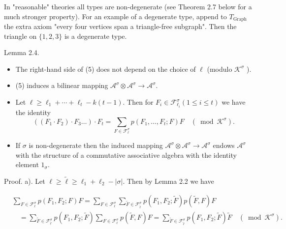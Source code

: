 \documentclass[10pt]{article}
\begin{document}
In "reasonable" theories all types are non-degenerate (see Theorem 2.7 below for a much stronger property). For an example of a degenerate type, append to $T_{\text {Graph }}$ the extra axiom "every four vertices span a triangle-free subgraph". Then the triangle on $\{1,2,3\}$ is a degenerate type.

Lemma 2.4.

\begin{itemize}
  \item[a)] The right-hand side of (5) does not depend on the choice of $\ell$ (modulo $\mathcal{K}^{\sigma}$ ).
  \item[b)] (5) induces a bilinear mapping $\mathcal{A}^{\sigma} \otimes \mathcal{A}^{\sigma} \longrightarrow \mathcal{A}^{\sigma}$.
\end{itemize}

\begin{itemize}
  \item[c)] Let $\ell \geq \ell_{1}+\cdots+\ell_{t}-k(t-1)$. Then for $F_{i} \in \mathcal{F}_{\ell_{i}}^{\sigma}(1 \leq i \leq t)$ we have the identity
$$
\left(\left(F_{1} \cdot F_{2}\right) \cdot F_{3} \ldots\right) \cdot F_{t}=\sum_{F \in \mathcal{F}_{\ell}^{\sigma}} p\left(F_{1}, \ldots, F_{t} ; F\right) F \quad\left(\bmod \mathcal{K}^{\sigma}\right) .
$$
  \item[d)] If $\sigma$ is non-degenerate then the induced mapping $\mathcal{A}^{\sigma} \otimes \mathcal{A}^{\sigma} \longrightarrow \mathcal{A}^{\sigma}$ endows $\mathcal{A}^{\sigma}$ with the structure of a commutative associative algebra with the identity element $1_{\sigma}$.
\end{itemize}

Proof. a). Let $\ell \geq \tilde{\ell} \geq \ell_{1}+\ell_{2}-|\sigma|$. Then by Lemma 2.2 we have

$$
\begin{aligned}
& \sum_{F \in \mathcal{F}_{\ell}^{\sigma}} p\left(F_{1}, F_{2} ; F\right) F=\sum_{F \in \mathcal{F}_{\ell}^{\sigma}} \sum_{\widetilde{F} \in \mathcal{F}_{\check{\ell}}^{\sigma}} p\left(F_{1}, F_{2} ; \widetilde{F}\right) p(\widetilde{F}, F) F \\
& \quad=\sum_{\widetilde{F} \in \mathcal{F}_{\check{\ell}}^{\sigma}} p\left(F_{1}, F_{2} ; \widetilde{F}\right) \sum_{F \in \mathcal{F}_{\ell}^{\sigma}} p(\widetilde{F}, F) F=\sum_{\widetilde{F} \in \mathcal{F}_{\tilde{\ell}}^{\sigma}} p\left(F_{1}, F_{2} ; \widetilde{F}\right) \widetilde{F} \quad\left(\bmod \mathcal{K}^{\sigma}\right) .
\end{aligned}
$$
\end{document}

